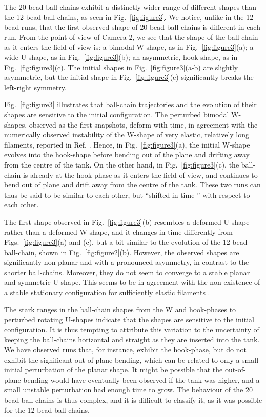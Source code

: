 \documentclass{article}
\begin{document}
The 20-bead ball-chains exhibit a distinctly wider range of different shapes than the 12-bead ball-chains, as seen in Fig.~\ref{fig:figure3}. We %
notice, unlike in the 12-bead runs, that the %
first observed shape of 20-bead ball-chains %
is different in each run. From the point of view of Camera 2, we see that the shape of the ball-chain as it enters the field of view is: a %
bimodal W-shape, as in Fig.~\ref{fig:figure3}(a); a %
wide U-shape, as in Fig.~\ref{fig:figure3}(b); an asymmetric, hook-shape, as in Fig.~\ref{fig:figure3}(c). The initial shapes in Fig.~\ref{fig:figure3}(a-b) %
are slightly asymmetric, %
but the initial 
shape in Fig.~\ref{fig:figure3}(c) significantly breaks the left-right symmetry. 

Fig.~\ref{fig:figure3} illustrates that ball-chain trajectories and the evolution of their shapes are sensitive to the initial configuration. The perturbed bimodal W-shapes, observed as the first snapshots, deform with time, in agreement with the numerically observed instability of the W-shape of very elastic, relatively long filaments, reported in Ref. \cite{lagomarsino2005hydrodynamic}. Hence, in Fig.~\ref{fig:figure3}(a), the initial W-shape evolves into the hook-shape before bending out of the plane and drifting away from the centre of the tank. %
On the other hand, in Fig.~\ref{fig:figure3}(c), the ball-chain is already at the hook-phase as it enters the field of view, and continues to bend out of plane and drift away from the centre of the tank. These two runs can thus be said to be similar to each other, but ``shifted in time%
” with respect to each other. 

The first shape observed in Fig.~\ref{fig:figure3}(b) resembles a deformed U-shape rather than a deformed W-shape, and it changes in time differently from Figs.~\ref{fig:figure3}(a) and (c), but 
 a bit similar to the evolution of the 12 bead ball-chain, shown in Fig.~\ref{fig:figure2}(b). However, the observed shapes are significantly non-planar and with a pronounced asymmetry, in contrast to %
 the shorter ball-chains. Moreover, they do not seem to converge to a stable planar and symmetric U-shape. This seems to be in agreement with the non-existence of a stable stationary configuration for sufficiently elastic filaments \cite{lagomarsino2005hydrodynamic,saggiorato2015conformations,bukowicki2018different}.

The stark ranges in the ball-chain shapes from the W and hook-phases to
perturbed %
rotating U-shapes indicate that the shapes are %
sensitive to the initial configuration. %
It is thus tempting to attribute this variation to the uncertainty of keeping the ball-chains horizontal and straight as they are inserted
into the tank. %
We have observed runs that, for instance, exhibit the hook-phase, but do not exhibit the significant out-of-plane bending, which can be related to only a small initial perturbation of the planar shape.  It %
might be possible that the out-of-plane bending would have eventually been observed if the tank was higher, and a small unstable perturbation had enough time to grow. The behaviour of the 20 bead ball-chains is thus 
complex, and it is difficult to classify it, %
as it was possible for the 12 bead ball-chains. %
\end{document}
